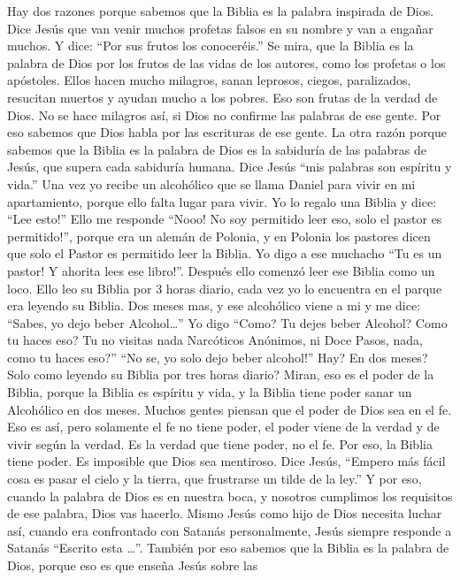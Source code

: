 Hay dos razones porque sabemos que la Biblia es la palabra inspirada de
Dios. Dice Jesús que van venir muchos profetas falsos en su nombre y van
a engañar muchos. Y dice: ``Por sus frutos los conoceréis.'' Se mira,
que la Biblia es la palabra de Dios por los frutos de las vidas de los
autores, como los profetas o los apóstoles. Ellos hacen mucho milagros,
sanan leprosos, ciegos, paralizados, resucitan muertos y ayudan mucho a
los pobres. Eso son frutas de la verdad de Dios. No se hace milagros
así, si Dios no confirme las palabras de ese gente. Por eso sabemos que
Dios habla por las escrituras de ese gente. La otra razón porque sabemos
que la Biblia es la palabra de Dios es la sabiduría de las palabras de
Jesús, que supera cada sabiduría humana. Dice Jesús ``mis palabras son
espíritu y vida.'' Una vez yo recibe un alcohólico que se llama Daniel
para vivir en mi apartamiento, porque ello falta lugar para vivir. Yo lo
regalo una Biblia y dice: ``Lee esto!'' Ello me responde ``Nooo! No soy
permitido leer eso, solo el pastor es permitido!'', porque era un alemán
de Polonia, y en Polonia los pastores dicen que solo el Pastor es
permitido leer la Biblia. Yo digo a ese muchacho ``Tu es un pastor! Y
ahorita lees ese libro!''. Después ello comenzó leer ese Biblia como un
loco. Ello leo su Biblia por 3 horas diario, cada vez yo lo encuentra en
el parque era leyendo su Biblia. Dos meses mas, y ese alcohólico viene a
mi y me dice: ``Sabes, yo dejo beber Alcohol\ldots{}'' Yo digo ``Como?
Tu dejes beber Alcohol? Como tu haces eso? Tu no visitas nada Narcóticos
Anónimos, ni Doce Pasos, nada, como tu haces eso?'' ``No se, yo solo
dejo beber alcohol!'' Hay? En dos meses? Solo como leyendo su Biblia por
tres horas diario? Miran, eso es el poder de la Biblia, porque la Biblia
es espíritu y vida, y la Biblia tiene poder sanar un Alcohólico en dos
meses. Muchos gentes piensan que el poder de Dios sea en el fe. Eso es
así, pero solamente el fe no tiene poder, el poder viene de la verdad y
de vivir según la verdad. Es la verdad que tiene poder, no el fe. Por
eso, la Biblia tiene poder. Es imposible que Dios sea mentiroso. Dice
Jesús, ``Empero más fácil cosa es pasar el cielo y la tierra, que
frustrarse un tilde de la ley.'' Y por eso, cuando la palabra de Dios es
en nuestra boca, y nosotros cumplimos los requisitos de ese palabra,
Dios vas hacerlo. Mismo Jesús como hijo de Dios necesita luchar así,
cuando era confrontado con Satanás personalmente, Jesús siempre responde
a Satanás ``Escrito esta \ldots{}''. También por eso sabemos que la
Biblia es la palabra de Dios, porque eso es que enseña Jesús sobre las
